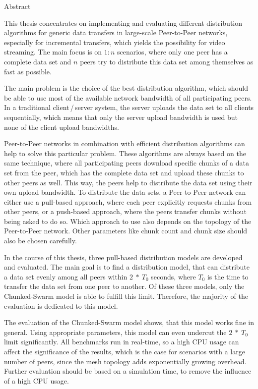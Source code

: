 
\begin{center} 
\huge Abstract
\end{center}


This thesis concentrates on implementing and evaluating different distribution algorithms for generic data transfers in large-scale Peer-to-Peer networks, especially for incremental transfers, which yields the possibility for video streaming. The main focus is on $1:n$ scenarios, where only one peer has a complete data set and $n$ peers try to distribute this data set among themselves as fast as possible.

The main problem is the choice of the best distribution algorithm, which should be able to use most of the available network bandwidth of all participating peers. In a traditional client\,/\,server system, the server uploads the data set to all clients sequentially, which means that only the server upload bandwidth is used but none of the client upload bandwidths.

Peer-to-Peer networks in combination with efficient distribution algorithms can help to solve this particular problem. These algorithms are always based on the same technique, where all participating peers download specific chunks of a data set from the peer, which has the complete data set and upload these chunks to other peers as well. This way, the peers help to distribute the data set using their own upload bandwidth. To distribute the data sets, a Peer-to-Peer network can either use a pull-based approach, where each peer explicitly requests chunks from other peers, or a push-based approach, where the peers transfer chunks without being asked to do so. Which approach to use also depends on the topology of the Peer-to-Peer network. Other parameters like chunk count and chunk size should also be chosen carefully.

In the course of this thesis, three pull-based distribution models are developed and evaluated. The main goal is to find a distribution model, that can distribute a data set evenly among all peers within $2\:*\:T_0$ seconds, where $T_0$ is the time to transfer the data set from one peer to another. Of these three models, only the Chunked-Swarm model is able to fulfill this limit. Therefore, the majority of the evaluation is dedicated to this model.

The evaluation of the Chunked-Swarm model shows, that this model works fine in general. Using appropriate parameters, this model can even undercut the $2\:*\:T_0$ limit significantly. All benchmarks run in real-time, so a high CPU usage can affect the significance of the results, which is the case for scenarios with a large number of peers, since the mesh topology adds exponentially growing overhead. Further evaluation should be based on a simulation time, to remove the influence of a high CPU usage.